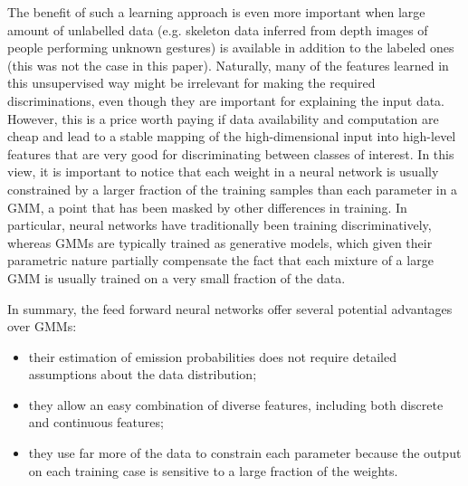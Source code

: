 The benefit of such a learning approach is even more important when large amount of unlabelled data (e.g. skeleton data
 inferred from depth images of people performing unknown gestures) is available in addition to the labeled ones 
(this was not the case in this paper). 
%
%
Naturally, many of the  features learned in this unsupervised way might  be irrelevant for making the required discriminations, 
even though they are important for explaining the input data. 
However, this is a price worth paying if data availability and computation are cheap and 
lead to  a stable mapping of the high-dimensional input  into high-level features 
that are very good for discriminating between classes of interest.
%
In this view, it is important to notice that each weight in a neural network is usually constrained by a larger fraction of 
the training samples than each parameter in a GMM, a point that has been masked by other differences in training. 
In particular,  neural networks have traditionally been training discriminatively, whereas GMMs are typically trained as generative models, 
which given their parametric  nature  partially compensate the fact that each mixture 
of a large GMM is usually trained on a very small fraction of the data.

In summary, the feed forward neural networks offer several potential advantages over GMMs:
\begin{itemize}
\item their estimation of emission  probabilities does not require detailed assumptions about the data distribution;
\item they allow an easy combination of diverse features, including both discrete and continuous features;
\item they use far more of the data to constrain each parameter because the output on each training case 
is sensitive to a large fraction of the weights.
\end{itemize}




